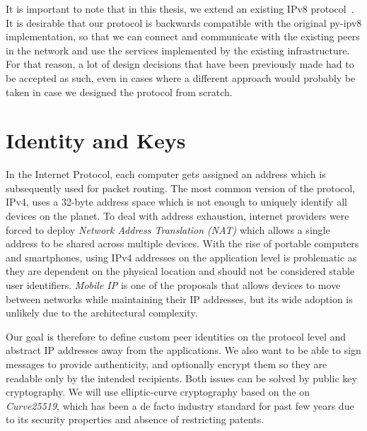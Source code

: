 
It is important to note that in this thesis, we extend an existing IPv8 protocol~\cite{ipv8}. It is desirable that our protocol is backwards compatible with the original py-ipv8 implementation, so that we can connect and communicate with the existing peers in the network and use the services implemented by the existing infrastructure. For that reason, a lot of design decisions that have been previously made had to be accepted as such, even in cases where a different approach would probably be taken in case we designed the protocol from scratch.

\section{Identity and Keys}

In the Internet Protocol, each computer gets assigned an address which is subsequently used for packet routing. The most common version of the protocol, IPv4, uses a 32-byte address space which is not enough to uniquely identify all devices on the planet.
To deal with address exhaustion, internet providers were forced to deploy \textit{Network Address Translation (NAT)} which allows a single address to be shared across multiple devices. With the rise of portable computers and smartphones, using IPv4 addresses on the application level is problematic as they are dependent on the physical location and should not be considered stable user identifiers. \textit{Mobile IP} \cite{mobileip} is one of the proposals that allows devices to move between networks while maintaining their IP addresses, but its wide adoption is unlikely due to the architectural complexity.

Our goal is therefore to define custom peer identities on the protocol level and abstract IP addresses away from the applications. We also want to be able to sign messages to provide authenticity, and optionally encrypt them so they are readable only by the intended recipients. Both issues can be solved by public key cryptography. We will use elliptic-curve cryptography based on the on \textit{Curve25519}, which has been a de facto industry standard for past few years due to its security properties and absence of restricting patents.

